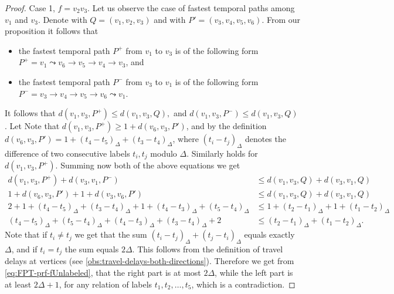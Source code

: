 \documentclass[11pt,a4paper]{article}
\theoremstyle{remark}
\theoremstyle{definition}
\begin{document}
\begin{proof}
    Case 1,  $f = v_2v_3$.
    Let us observe the case of fastest temporal paths among $v_{1}$ and $v_{3}$.
    Denote with $Q = (v_{1}, v_2, v_3)$ and with $P' = (v_3,v_4,v_5,v_6)$.
    From our proposition it follows that
    \begin{itemize}
        \item the fastest temporal path $P ^ +$ from $v_1$ to $v_3$ 
    is of the following form 
    $P^+ = v_{1}  \leadsto v_6 \rightarrow v_5 \rightarrow v_4 \rightarrow v_3$,
    and
        \item the fastest temporal path $P ^ -$ from $v_{3}$ to $v_{1}$ 
    is of the following form 
    $P^- = v_{3} \rightarrow v_{4} \rightarrow v_5 \rightarrow v_6 \leadsto v_1$.
    \end{itemize}
    It follows that 
    $
    d(v_{1}, v_{3}, P^+) \leq d(v_{1}, v_{3}, Q),
    $
    and
    $
    d(v_{1}, v_{3}, P^-) \leq d(v_{1}, v_{3}, Q)
    $.
    Let 
    Note that $d(v_{1}, v_{3}, P^+) \geq 1 + d(v_6,v_3,P')$,
    and by the definition $d(v_6,v_3,P') = 1 + (t_4 - t_5)_\Delta + (t_3 - t_4)_\Delta$,
    where $(t_i - t_j)_\Delta$ denotes the difference of two consecutive labels $t_i, t_j$ modulo $\Delta$.
    Similarly holds for $d(v_{1}, v_{3}, P^+)$.
    Summing now both of the above equations we get
    \begin{equation}
    \begin{split} \label{eq:FPT-prf-fUnlabeled}
        d(v_{1}, v_{3}, P^+) + d(v_{3}, v_{1}, P^-) &\leq 
        d(v_{1}, v_{3}, Q) + d(v_{3}, v_{1}, Q) \\
        1 + d(v_6,v_3,P') + 1 + d(v_3,v_6,P') &\leq d(v_{1}, v_{3}, Q) + d(v_{3}, v_{1}, Q) \\
        2 + 
        1 + (t_4 - t_5)_\Delta + (t_3 - t_4)_\Delta +
        1 + (t_4 - t_3)_\Delta + (t_5 - t_4)_\Delta 
        &\leq 
        1 + (t_2 - t_1)_\Delta + 
        1 + (t_1 - t_2)_\Delta\\
        (t_4 - t_5)_\Delta + (t_5 - t_4)_\Delta +
        (t_4 - t_3)_\Delta + (t_3 - t_4)_\Delta  + 2 
        &\leq 
        (t_2 - t_1)_\Delta + (t_1 - t_2)_\Delta.
    \end{split}
    \end{equation}
    Note that if $t_i \neq t_j$ we get that 
    the sum
    $(t_i - t_j)_\Delta + (t_j - t_i)_\Delta$ equals exactly $\Delta$,
    and if $t_i = t_j$ the sum equals $2\Delta$.
    This follows from the definition of travel delays at vertices (see \cref{obs:travel-delays-both-directions}).
    Therefore we get from \cref{eq:FPT-prf-fUnlabeled}, 
    that the right part is at most $2 \Delta$, while the left part is at least $2 \Delta + 1$,
    for any relation of labels $t_1,t_2, \dots, t_5$,
    which is a contradiction.


\end{proof}
\end{document}

